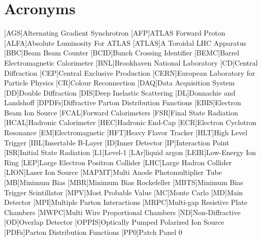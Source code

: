 \chapter{Acronyms}\label{chapter:acronyms}

\begin{acronym}[BRAHMS]
	[AGS]{Alternating Gradient Synchrotron}
	[AFP]{ATLAS Forward Proton}
	[ALFA]{Absolute Luminosity For ATLAS}
	[ATLAS]{A Toroidal LHC Apparatus}
	[BBC]{Beam Beam Counter}
	[BCID]{Bunch Crossing Identifier}
	[BEMC]{Barrel Electromagnetic Calorimeter}
	[BNL]{Brookhaven National Laboratory}
	[CD]{Central Diffraction}
	[CEP]{Central Exclusive Production}
	[CERN]{European Laboratory for Particle Physics }
	[CR]{Colour Reconnection}
	[DAQ]{Data Acquisition System}
	[DD]{Double Diffraction}
	[DIS]{Deep Inelastic Scattering}
	[DL]{Donnachie and Landshoff}
	[DPDFs]{Diffractive Parton
	Distribution Functions}
	[EBIS]{Electron Beam Ion Source}
	[FCAL]{Forward Calorimeters}
	[FSR]{Final State Radiation}
	[HCAL]{Hadronic Calorimeter}
	[HEC]{Hadronic End-Cap}
	[ECR]{Electron Cyclotron Resonance}
	[EM]{Electromagnetic}
	[HFT]{Heavy Flavor Tracker}
	[HLT]{High Level Trigger}
	[IBL]{Insertable B-Layer}
	[ID]{Inner Detector}
	[IP]{Interaction Point}
	[ISR]{Initial State Radiation}
	[L1]{Level-1}
	[LAr]{liquid argon}
	[LEIR]{Low-Energy Ion Ring}
	[LEP]{Large Electron Positron Collider}
	[LHC]{Large Hadron Collider}
	[LION]{Laser Ion Source}
	[MAPMT]{Multi Anode Photomultiplier Tube}
	[MB]{Minimum Bias}
	[MBR]{Minimum Bias Rockefeller}
	[MBTS]{Minimum Bias Trigger Scintillator}
	[MPV]{Most Probable Value}
	[MC]{Monte Carlo}
	[MD]{Main Detector}
	[MPI]{Multiple Parton Interactions}
	[MRPC]{Multi-gap
		Resistive Plate Chambers}
	[MWPC]{Multi Wire Proportional Chambers}
	[ND]{Non-Diffractive}
	[OD]{Overlap Detector}
	[OPPIS]{Optically Pumped Polarized Ion Source}
	[PDFs]{Parton Distribution Functions}
	[PP0]{Patch Panel 0}

\end{acronym}
